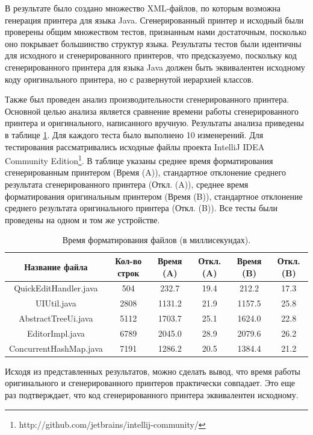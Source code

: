 \documentclass{matmex-diploma}
\begin{document}
В результате было создано множество XML-файлов, по которым возможна генерация принтера для языка Java. Сгенерированный принтер и исходный были проверены общим множеством тестов, признанным нами достаточным, посколько оно покрывает большинство структур языка. Результаты тестов были идентичны для исходного и сгенерированного принтеров, что предсказуемо, поскольку код сгенерированного принтера для языка Java должен быть эквивалентен исходному коду оригинального принтера, но с развернутой иерархией классов.

Также был проведен анализ производительности сгенерированного принтера. Основной целью анализа является сравнение времени работы сгенерированного принтера и оригинального, написанного вручную. Результаты анализа приведены в таблице \ref{JavaPerformanceTbl}. Для каждого теста было выполнено 10 изменерений. Для тестирования рассматривались исходные файлы проекта IntelliJ IDEA Community Edition\footnote{http://github.com/jetbrains/intellij-community/}.  В таблице указаны среднее время форматирования сгенерированным принтером (Время (A)), стандартное отклонение среднего результата сгенерированного принтера (Откл. (A)), среднее время форматирования оригинальным принтером (Время (B)), стандартное отклонение среднего результата оригинального принтера (Откл. (B)). Все тесты были проведены на одном и том же устройстве.

\begin{table}[H]
\begin{center}
\begin{tabular}{|c|c|c|c|c|c|}
\hline
Название файла & Кол-во строк & Время (A) & Откл. (A) & Время (B) & Откл. (B)\\
\hline
QuickEditHandler.java & 504 & 232.7 & 19.4 & 212.2 & 17.3\\
UIUtil.java & 2808 & 1131.2 & 21.9 & 1157.5 & 25.8\\
AbstractTreeUi.java & 5112 & 1703.7 & 25.1 & 1624.0 & 22.8\\
EditorImpl.java & 6789 & 2045.0 & 28.9 & 2079.6 & 26.2\\
ConcurrentHashMap.java & 7191 & 1286.2 & 20.5 & 1384.4 & 21.2\\
\hline
\end{tabular}
\end{center}
\caption{\label{JavaPerformanceTbl}Время форматирования файлов (в миллисекундах).}
\end{table} 

Исходя из представленных результатов, можно сделать вывод, что время работы оригинального и сгенерированного принтеров практически совпадает. Это еще раз подтверждает, что код сгенерированного принтера эквивалентен исходному.
\end{document}
